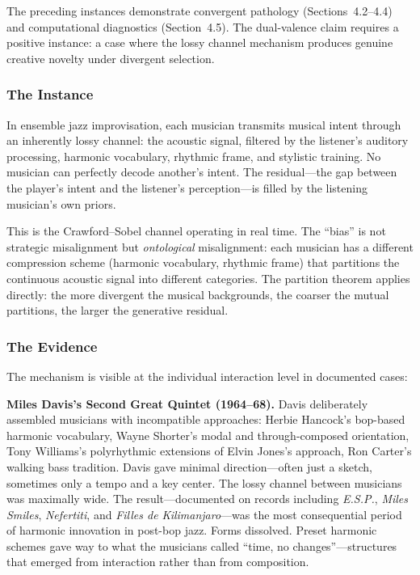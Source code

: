 \documentclass[12pt,letterpaper]{article}
\theoremstyle{definition}
\theoremstyle{remark}
\begin{document}
\medskip
The preceding instances demonstrate convergent pathology (Sections~4.2--4.4) and computational diagnostics (Section~4.5). The dual-valence claim requires a positive instance: a case where the lossy channel mechanism produces genuine creative novelty under divergent selection.

\subsubsection{The Instance}

In ensemble jazz improvisation, each musician transmits musical intent through an inherently lossy channel: the acoustic signal, filtered by the listener's auditory processing, harmonic vocabulary, rhythmic frame, and stylistic training. No musician can perfectly decode another's intent. The residual---the gap between the player's intent and the listener's perception---is filled by the listening musician's own priors.

This is the Crawford--Sobel channel operating in real time. The ``bias'' is not strategic misalignment but \emph{ontological} misalignment: each musician has a different compression scheme (harmonic vocabulary, rhythmic frame) that partitions the continuous acoustic signal into different categories. The partition theorem applies directly: the more divergent the musical backgrounds, the coarser the mutual partitions, the larger the generative residual.

\subsubsection{The Evidence}

The mechanism is visible at the individual interaction level in documented cases:

\textbf{Miles Davis's Second Great Quintet (1964--68).} Davis deliberately assembled musicians with incompatible approaches: Herbie Hancock's bop-based harmonic vocabulary, Wayne Shorter's modal and through-composed orientation, Tony Williams's polyrhythmic extensions of Elvin Jones's approach, Ron Carter's walking bass tradition. Davis gave minimal direction---often just a sketch, sometimes only a tempo and a key center. The lossy channel between musicians was maximally wide. The result---documented on records including \emph{E.S.P.}, \emph{Miles Smiles}, \emph{Nefertiti}, and \emph{Filles de Kilimanjaro}---was the most consequential period of harmonic innovation in post-bop jazz. Forms dissolved. Preset harmonic schemes gave way to what the musicians called ``time, no changes''---structures that emerged from interaction rather than from composition.
\end{document}
